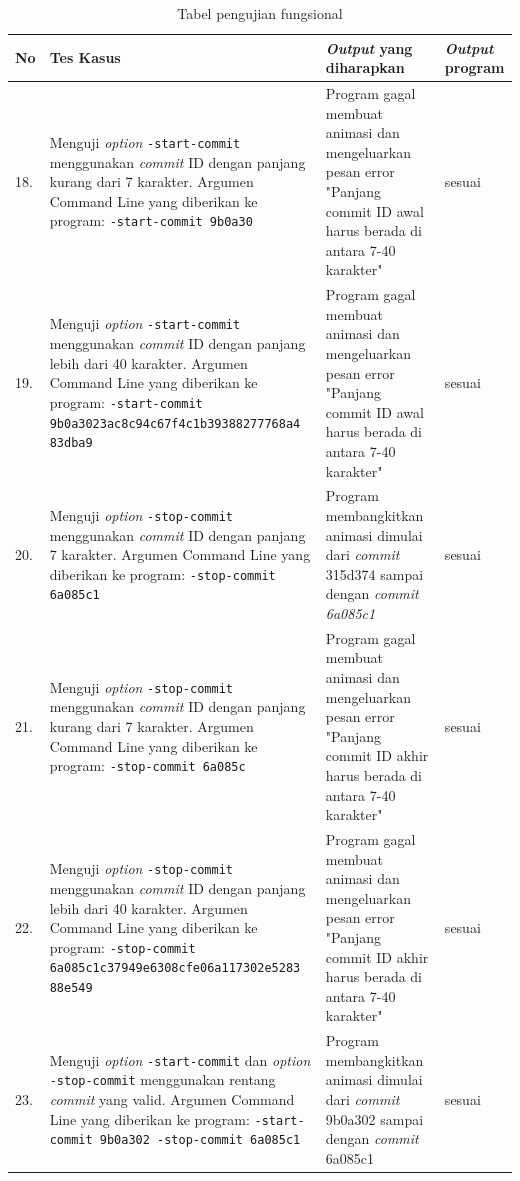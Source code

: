 \begin{table}[htbp]
	\centering
	\caption{Tabel pengujian fungsional}
	
		\begin{tabular}{|p{0.3cm}|>{\raggedright} p{7 cm}| p{5.5 cm}| p{3 cm}|} \hline
		No & Tes Kasus	& \textit{Output} yang diharapkan & \textit{Output} program \\ \hline

18. & Menguji \textit{option} \texttt{-start-commit} menggunakan \textit{commit} ID dengan panjang kurang dari 7 karakter. Argumen Command Line yang diberikan ke program: \texttt{-start-commit 9b0a30} & Program gagal membuat animasi dan mengeluarkan pesan error "Panjang commit ID awal harus berada di antara 7-40 karakter" & sesuai  \\ \hline
		19.&  Menguji \textit{option} \texttt{-start-commit} menggunakan \textit{commit} ID dengan panjang lebih dari 40 karakter. Argumen Command Line yang diberikan ke program:  \texttt{-start-commit 9b0a3023ac8c94c67f4c1b39388277768a4 83dba9} & Program gagal membuat animasi dan mengeluarkan pesan error "Panjang commit ID awal harus berada di antara 7-40 karakter" & sesuai  \\ \hline
		20. & Menguji \textit{option} \texttt{-stop-commit} menggunakan \textit{commit} ID dengan panjang 7 karakter. Argumen Command Line yang diberikan ke program:  \texttt{-stop-commit 6a085c1}  & Program membangkitkan animasi dimulai dari \textit{commit} 315d374 sampai dengan \textit{commit 6a085c1}  & sesuai  \\ \hline
		21. & Menguji \textit{option} \texttt{-stop-commit} menggunakan \textit{commit} ID dengan panjang kurang dari 7 karakter. Argumen Command Line yang diberikan ke program: \texttt{-stop-commit 6a085c} & Program gagal membuat animasi dan mengeluarkan pesan error "Panjang commit ID akhir harus berada di antara 7-40 karakter" & sesuai  \\ \hline
		22. & Menguji \textit{option} \texttt{-stop-commit} menggunakan \textit{commit} ID dengan panjang lebih dari 40 karakter. Argumen Command Line yang diberikan ke program: \texttt{-stop-commit 6a085c1c37949e6308cfe06a117302e5283 88e549} & Program gagal membuat animasi dan mengeluarkan pesan error "Panjang commit ID akhir harus berada di antara 7-40 karakter"  & sesuai  \\ \hline
		23. & Menguji \textit{option} \texttt{-start-commit} dan \textit{option} \texttt{-stop-commit} menggunakan rentang \textit{commit} yang valid. Argumen Command Line yang diberikan ke program: \texttt{-start-commit 9b0a302 -stop-commit 6a085c1} & Program membangkitkan animasi dimulai dari \textit{commit} 9b0a302 sampai dengan \textit{commit} 6a085c1 & sesuai  \\ \hline

\end{tabular}
\end{table}
